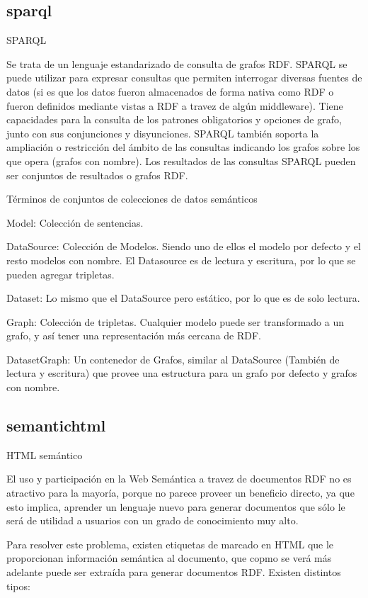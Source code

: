 \subsection{sparql}
SPARQL

Se trata de un lenguaje estandarizado de consulta de grafos RDF.
SPARQL se puede utilizar para expresar consultas que permiten interrogar diversas fuentes de datos (si es que los datos fueron almacenados 
de forma nativa como RDF o fueron definidos mediante vistas a RDF a travez de algún middleware). Tiene capacidades para la consulta
de los patrones obligatorios y opciones de grafo, junto con sus conjunciones y disyunciones. SPARQL también soporta 
la ampliación o restricción del ámbito de las consultas indicando los grafos sobre los que opera (grafos con nombre). Los resultados de las consultas
SPARQL pueden ser conjuntos de resultados o grafos RDF.


Términos de conjuntos de colecciones de datos semánticos

Model: Colección de sentencias.

DataSource: Colección de Modelos. Siendo uno de ellos el modelo por defecto y el resto modelos con nombre. El Datasource es de lectura y escritura, por lo que se pueden agregar tripletas.

Dataset: Lo mismo que el DataSource pero estático, por lo que es de solo lectura.

Graph: Colección de tripletas. Cualquier modelo puede ser transformado a un grafo, y así tener una representación más cercana de RDF.

DatasetGraph: Un contenedor de Grafos, similar al DataSource (También de lectura y escritura) que provee una estructura para un grafo por defecto y grafos con nombre.

\subsection{semantichtml}
HTML semántico

El uso y participación en la Web Semántica a travez de documentos RDF no es atractivo para la mayoría, porque no parece proveer un beneficio 
directo, ya que esto implica, aprender un lenguaje nuevo para generar documentos que sólo le será de utilidad a usuarios con un grado de conocimiento 
muy alto. 

Para resolver este problema, existen etiquetas de marcado en HTML que le proporcionan información semántica al documento, que copmo se verá más adelante 
puede ser extraída para generar documentos RDF. Existen distintos tipos:

